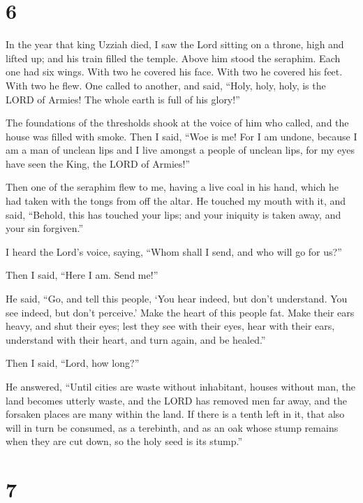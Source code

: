 \hypertarget{section-5}{%
\section{6}\label{section-5}}

 In the year that king Uzziah died, I saw the Lord sitting
on a throne, high and lifted up; and his train filled the temple.
 Above him stood the seraphim. Each one had six wings.
With two he covered his face. With two he covered his feet. With two he
flew.  One called to another, and said, ``Holy, holy,
holy, is the LORD of Armies! The whole earth is full of his glory!''

 The foundations of the thresholds shook at the voice of
him who called, and the house was filled with smoke.  Then
I said, ``Woe is me! For I am undone, because I am a man of unclean lips
and I live amongst a people of unclean lips, for my eyes have seen the
King, the LORD of Armies!''

 Then one of the seraphim flew to me, having a live coal
in his hand, which he had taken with the tongs from off the altar.
 He touched my mouth with it, and said, ``Behold, this has
touched your lips; and your iniquity is taken away, and your sin
forgiven.''

 I heard the Lord's voice, saying, ``Whom shall I send,
and who will go for us?''

Then I said, ``Here I am. Send me!''

 He said, ``Go, and tell this people, `You hear indeed,
but don't understand. You see indeed, but don't perceive.'
 Make the heart of this people fat. Make their ears
heavy, and shut their eyes; lest they see with their eyes, hear with
their ears, understand with their heart, and turn again, and be
healed.''

 Then I said, ``Lord, how long?''

He answered, ``Until cities are waste without inhabitant, houses without
man, the land becomes utterly waste,  and the LORD has
removed men far away, and the forsaken places are many within the land.
 If there is a tenth left in it, that also will in turn
be consumed, as a terebinth, and as an oak whose stump remains when they
are cut down, so the holy seed is its stump.''

\hypertarget{section-6}{%
\section{7}\label{section-6}}

